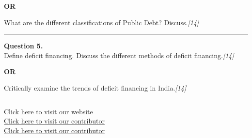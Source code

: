 \documentclass[11pt,a4paper]{article}
\newcommand{\pts}[1]{\hfill   \textit{[#1]}}
\begin{document}
\centerline{   \textbf{OR}}

What are the different classifications of Public Debt? Discuss.\pts{14}

\medskip\rule{\linewidth}{0.2pt}




\noindent   \textbf{Question 5.} \\
Define deficit financing. Discuss the different methods of deficit financing.\pts{14}

\centerline{   \textbf{OR}}

Critically examine the trends of deficit financing in India.\pts{14}

\vfill
\rule{\linewidth}{0.4pt}

\begin{center}\small
  \href{https://bhu-exam.vercel.app/}{Click here to visit our website}\\[4pt]
  \href{https://me-aryan.vercel.app/}{Click here to visit our contributor}\\[4pt]
  \href{https://quashan-me.vercel.app/}{Click here to visit our contributor}
\end{center}
\end{document}
